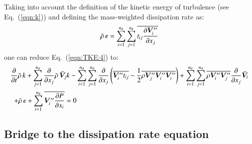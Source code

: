 \documentclass{warpdoc}
\newcommand{\alb}{\vspace{0.2cm}\\} %
\newcommand{\nd}{{{n}_{\rm d}}}
\newcommand{\mfd}{\displaystyle}
\begin{document}
%
Taking into account the definition of the kinetic energy of turbulence (see Eq.\ (\ref{eqn:k})) and defining the mass-weighted dissipation rate as:
%
\begin{equation}
  \wbar{\rho}\,  \epsilon
    = \sum_{i=1}^{\nd} \sum_{j=1}^{\nd}
      \overline{ t_{ij}\frac{\partial \bm{V}_i^{\prime\prime}}{\partial x_j}}
  \label{eqn:eps}
\end{equation}
%
one can reduce Eq.\ (\ref{eqn:TKE:4}) to:
%
\begin{equation}
  \begin{array}{l}
  \mfd
    \frac{\partial }{\partial t} \wbar{\rho}\, k
   +  \sum_{j=1}^{\nd}\frac{\partial }{\partial x_j} \wbar{\rho}\, {\wtilde{\bm{V}}_j} k
   - \mfd\sum_{i=1}^\nd\sum_{j=1}^{\nd} \frac{\partial }{\partial x_j} \left( \overline{\bm{V}_i^{\prime\prime} t_{ij}}
                     - {\frac{1}{2}} \overline{\rho {\bm{V}_j^{\prime\prime}} \bm{V}_i^{\prime\prime} \bm{V}_i^{\prime\prime}} \right)
   + \sum_{i=1}^\nd \mfd\sum_{j=1}^{\nd}
                              \overline{\rho \bm{V}_i^{\prime\prime} \bm{V}_j^{\prime\prime}}
                                     \frac{\partial }{\partial x_j} {\wtilde{\bm{V}}_i} \alb~~
   + \wbar{\rho}\, \epsilon
   + \mfd\sum_{i=1}^{\nd}\overline{\bm{V}_i^{\prime\prime} \frac{\partial P}{\partial x_i}}
   = 0
  \end{array}
  \label{eqn:TKE:final}
\end{equation}
%





\subsection{Bridge to the dissipation rate equation}
\end{document}
